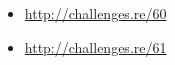 \subsection{\Exercises}

\begin{itemize}
	\item \url{http://challenges.re/60}
	\item \url{http://challenges.re/61}
\end{itemize}


